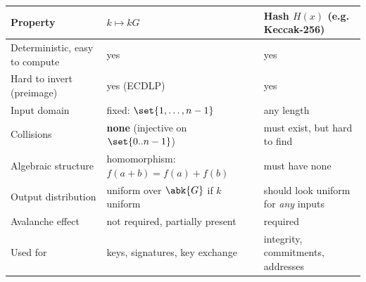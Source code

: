 \begin{center}
  \small
  \begin{tabularx}{\textwidth}{X X X}
    \toprule
    Property & $k \mapsto kG$ & Hash $H(x)$ (e.g. Keccak-256) \\
    \midrule
    Deterministic, easy to compute & yes & yes \\
    Hard to invert (preimage) & yes (ECDLP) & yes \\
    Input domain & fixed: $\set{1,\ldots,n-1}$ & any length \\
    Collisions & \textbf{none} (injective on $\set{0..n-1}$) & must exist, but hard to find \\
    Algebraic structure & homomorphism: $f(a+b) = f(a)+f(b)$ & must have none \\
    Output distribution & uniform over $\abk{G}$ if $k$ uniform & should look uniform for \textit{any} inputs \\
    Avalanche effect & not required, partially present & required \\
    Used for & keys, signatures, key exchange & integrity, commitments, addresses \\
    \bottomrule
  \end{tabularx}
\end{center}
